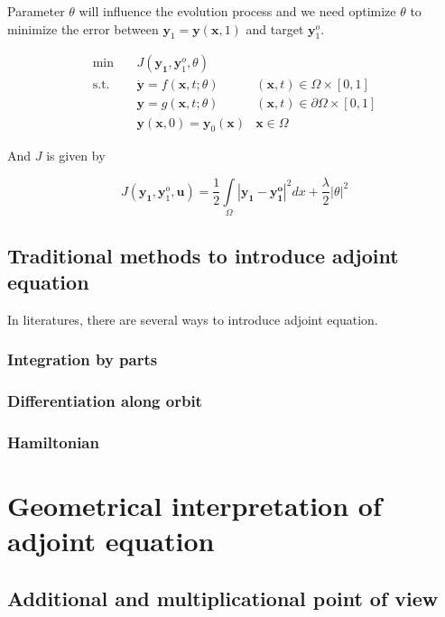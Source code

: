 \documentclass{article}
\begin{document}
Parameter $\theta$ will influence the evolution process and we need optimize $\theta$ to minimize the error between $ \mathbf{y}_1 = \mathbf{y}(\mathbf{x}, 1)$ and target $ \mathbf{y}_1^o $.

$$
\begin{array}{rcll}
\min &~& J(\mathbf{y_1}, \mathbf{y}_1^o, \theta) & \\
\mathrm{s.t.} &~& \dot{\mathbf{y}} = f(\mathbf{x}, t; \theta) & (\mathbf{x}, t) \in \Omega \times [0, 1] \\
&~& \mathbf{y} = g(\mathbf{x}, t; \theta) & (\mathbf{x}, t) \in \partial \Omega \times [0, 1] \\
&~& \mathbf{y}(\mathbf{x}, 0) = \mathbf{y}_0(\mathbf{x}) & \mathbf{x} \in \Omega
\end{array}
$$

And $ J $ is given by

$$
J(\mathbf{y_1}, \mathbf{y}_1^o, \mathbf{u}) = \frac{1}{2} \int\limits_{\Omega}|\mathbf{y_1} - \mathbf{y_1^o}|^2dx + \frac{\lambda}{2} |\theta|^2
$$

\subsection{Traditional methods to introduce adjoint equation}

In literatures, there are several ways to introduce adjoint equation.

\subsubsection{Integration by parts}

\subsubsection{Differentiation along orbit}

\subsubsection{Hamiltonian}

\section{Geometrical interpretation of adjoint equation}

\subsection{Additional and multiplicational point of view}
\end{document}
